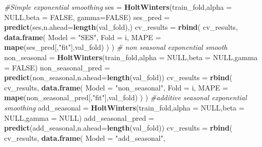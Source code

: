 \documentclass[
]{article}
\newenvironment{Shaded}{\begin{snugshade}}{\end{snugshade}}
\newcommand{\AttributeTok}[1]{\textcolor[rgb]{0.13,0.29,0.53}{#1}}
\newcommand{\CommentTok}[1]{\textcolor[rgb]{0.56,0.35,0.01}{\textit{#1}}}
\newcommand{\ConstantTok}[1]{\textcolor[rgb]{0.56,0.35,0.01}{#1}}
\newcommand{\FunctionTok}[1]{\textcolor[rgb]{0.13,0.29,0.53}{\textbf{#1}}}
\newcommand{\NormalTok}[1]{#1}
\newcommand{\OtherTok}[1]{\textcolor[rgb]{0.56,0.35,0.01}{#1}}
\newcommand{\StringTok}[1]{\textcolor[rgb]{0.31,0.60,0.02}{#1}}
\begin{document}
\begin{Shaded}
\begin{Highlighting}[]
  \CommentTok{\#Simple exponential smoothing}
\NormalTok{  ses }\OtherTok{=} \FunctionTok{HoltWinters}\NormalTok{(train\_fold,}\AttributeTok{alpha =} \ConstantTok{NULL}\NormalTok{,}\AttributeTok{beta =} \ConstantTok{FALSE}\NormalTok{, }\AttributeTok{gamma=}\ConstantTok{FALSE}\NormalTok{)}
\NormalTok{  ses\_pred }\OtherTok{=} \FunctionTok{predict}\NormalTok{(ses,}\AttributeTok{n.ahead=}\FunctionTok{length}\NormalTok{(val\_fold),)}
\NormalTok{  cv\_results }\OtherTok{=} \FunctionTok{rbind}\NormalTok{( }
\NormalTok{                cv\_results,}
                \FunctionTok{data.frame}\NormalTok{(}
                  \AttributeTok{Model =} \StringTok{"SES"}\NormalTok{,}
                  \AttributeTok{Fold =}\NormalTok{ i,}
                  \AttributeTok{MAPE =} \FunctionTok{mape}\NormalTok{(ses\_pred[,}\StringTok{"fit"}\NormalTok{],val\_fold)}
\NormalTok{                )}
\NormalTok{                )}
  \CommentTok{\# non seasonal exponential smooth}
\NormalTok{  non\_seasonal }\OtherTok{=} \FunctionTok{HoltWinters}\NormalTok{(train\_fold,}\AttributeTok{alpha =} \ConstantTok{NULL}\NormalTok{,}\AttributeTok{beta =} \ConstantTok{NULL}\NormalTok{,}\AttributeTok{gamma =} \ConstantTok{FALSE}\NormalTok{)}
\NormalTok{  non\_seasonal\_pred }\OtherTok{=} \FunctionTok{predict}\NormalTok{(non\_seasonal,}\AttributeTok{n.ahead=}\FunctionTok{length}\NormalTok{(val\_fold))}
\NormalTok{  cv\_results }\OtherTok{=} \FunctionTok{rbind}\NormalTok{( }
\NormalTok{                cv\_results,}
                \FunctionTok{data.frame}\NormalTok{(}
                  \AttributeTok{Model =} \StringTok{"non\_seasonal"}\NormalTok{,}
                  \AttributeTok{Fold =}\NormalTok{ i,}
                  \AttributeTok{MAPE =} \FunctionTok{mape}\NormalTok{(non\_seasonal\_pred[,}\StringTok{"fit"}\NormalTok{],val\_fold)}
\NormalTok{                )}
\NormalTok{                )}
  \CommentTok{\#additive seasonal exponential smoothing }
\NormalTok{  add\_seasonal }\OtherTok{=} \FunctionTok{HoltWinters}\NormalTok{(train\_fold,}\AttributeTok{alpha =} \ConstantTok{NULL}\NormalTok{,}\AttributeTok{beta =} \ConstantTok{NULL}\NormalTok{,}\AttributeTok{gamma =} \ConstantTok{NULL}\NormalTok{)}
\NormalTok{  add\_seasonal\_pred }\OtherTok{=} \FunctionTok{predict}\NormalTok{(add\_seasonal,}\AttributeTok{n.ahead=}\FunctionTok{length}\NormalTok{(val\_fold))}
\NormalTok{  cv\_results }\OtherTok{=} \FunctionTok{rbind}\NormalTok{( }
\NormalTok{                cv\_results,}
                \FunctionTok{data.frame}\NormalTok{(}
                  \AttributeTok{Model =} \StringTok{"add\_seasonal"}\NormalTok{,}

\end{Highlighting}
\end{Shaded}
\end{document}
